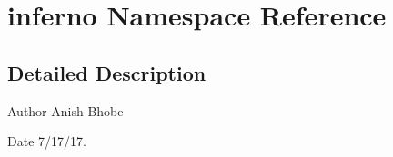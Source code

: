 \hypertarget{namespaceinferno}{}\section{inferno Namespace Reference}
\label{namespaceinferno}


\subsection{Detailed Description}
\begin{DoxyAuthor}{Author}
Anish Bhobe 
\end{DoxyAuthor}
\begin{DoxyDate}{Date}
7/17/17. 
\end{DoxyDate}
